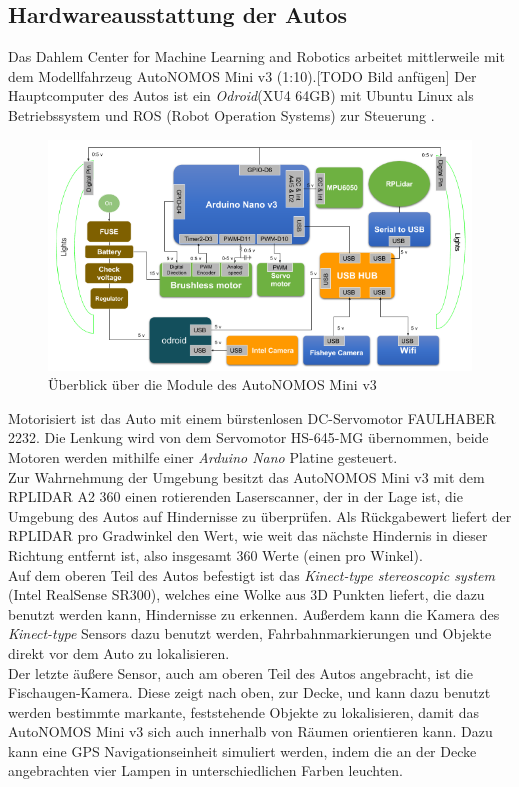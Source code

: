 \subsection{Hardwareausstattung der Autos}
Das Dahlem Center for Machine Learning and Robotics arbeitet mittlerweile mit dem Modellfahrzeug AutoNOMOS Mini v3 (1:10).[TODO Bild anfügen] Der Hauptcomputer des Autos ist ein \textit{Odroid}(XU4 64GB) mit Ubuntu Linux als Betriebssystem und ROS (Robot Operation Systems) zur Steuerung \citep{fubAuto}.\\
\begin{figure}
\centering
\includegraphics[scale=0.8]{Bilder/AutoNOMOS_mini_v3.png} 
\caption{Überblick über die Module des AutoNOMOS Mini v3}
\end{figure}
Motorisiert ist das Auto mit einem bürstenlosen DC-Servomotor FAULHABER 2232. Die Lenkung wird von dem Servomotor HS-645-MG übernommen, beide Motoren werden mithilfe einer \textit{Arduino Nano} Platine gesteuert. \\
Zur Wahrnehmung der Umgebung besitzt das AutoNOMOS Mini v3 mit dem RPLIDAR A2 360 einen rotierenden Laserscanner, der in der Lage ist, die Umgebung des Autos auf Hindernisse zu überprüfen. Als Rückgabewert liefert der RPLIDAR pro Gradwinkel den Wert, wie weit das nächste Hindernis in dieser Richtung entfernt ist, also insgesamt 360 Werte (einen pro Winkel). \\
Auf dem oberen Teil des Autos befestigt ist das \textit{Kinect-type stereoscopic system} (Intel RealSense SR300), welches eine Wolke aus 3D Punkten liefert, die dazu benutzt werden kann, Hindernisse zu erkennen. Außerdem kann die Kamera des \textit{Kinect-type} Sensors dazu benutzt werden, Fahrbahnmarkierungen und Objekte direkt vor dem Auto zu lokalisieren.\\
Der letzte äußere Sensor, auch am oberen Teil des Autos angebracht, ist die Fischaugen-Kamera. Diese zeigt nach oben, zur Decke, und kann dazu benutzt werden bestimmte markante, feststehende Objekte zu lokalisieren, damit das AutoNOMOS Mini v3 sich auch innerhalb von Räumen orientieren kann. Dazu kann eine GPS Navigationseinheit simuliert werden, indem die an der Decke angebrachten vier Lampen in unterschiedlichen Farben leuchten. \\
